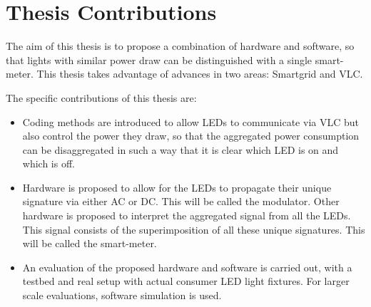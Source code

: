 

\section{Thesis Contributions}

The aim of this thesis is to propose a combination of hardware and software, so that lights with similar power draw can be distinguished with a single smart-meter.
This thesis takes advantage of advances in two areas: Smartgrid and VLC.

The specific contributions of this thesis are:

\begin{itemize}
	\item Coding methods are introduced to allow LEDs to communicate via VLC but also control the power they draw, so that the aggregated power consumption can be disaggregated in such a way that it is clear which LED is on and which is off.

	\item Hardware is proposed to allow for the LEDs to propagate their unique signature via either AC or DC. This will be called the modulator. Other hardware is proposed to interpret the aggregated signal from all the LEDs. This signal consists of the superimposition of all these unique signatures. This will be called the smart-meter.

	\item An evaluation of the proposed hardware and software is carried out, with a testbed and real setup with actual consumer LED light fixtures. For larger scale evaluations, software simulation is used. 
\end{itemize}
